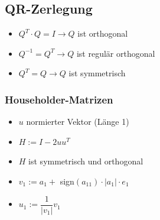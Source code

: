 \documentclass[6pt,a4paper]{scrartcl}
\begin{document}
\begin{multicols*}{4}
		\subsection{QR-Zerlegung}	
			\begin{itemize}\itemsep0pt				
				\item $Q^{T}\cdot Q =I \rightarrow Q$ ist orthogonal 
				\item 	$Q^{-1} = Q^{T} \rightarrow Q$ ist regulär orthogonal
				\item 	$Q^{T} = Q \rightarrow Q$ ist symmetrisch 
			\end{itemize}
		
			\subsubsection{Householder-Matrizen}
				\begin{itemize}\itemsep0pt				
					\item $u$ normierter Vektor (Länge 1)
					\item $H := I - 2uu^{T}$
					\item $H$ ist symmetrisch und orthogonal
					\item $v_{1} := a_{1} + $ sign$(a_{11}) \cdot |a_{1}| \cdot e_{1}$
					\item $u_{1} := \dfrac{1}{|v_{1}|}v_{1}$
					
				
				\end{itemize}
				

\end{multicols*}
\end{document}
